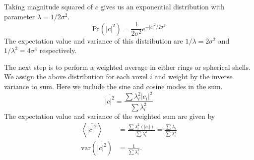 \documentclass{article}
\begin{document}
Taking magnitude squared of $c$ gives us an exponential distribution with parameter $\lambda=1/2\sigma^2$.
\begin{equation}
\mathrm{Pr}(|c|^2) = \frac{1}{2\sigma^2}e^{-|c|^2/2\sigma^2}
\end{equation}
The expectation value and variance of this distribution are $1/\lambda = 2\sigma^2$ and $1/\lambda^2 = 4\sigma^4$ respectively.

The next step is to perform a weighted average in either rings or spherical shells. We assign the above distribution for each voxel $i$ and weight by the inverse variance to sum. Here we include the sine and cosine modes in the sum.
\begin{equation}
\overline{|c|^2} = \frac{\sum\lambda_i^2 |c_i|^2}{\sum \lambda_i^2}
\end{equation}
The expectation value and variance of the weighted sum are given by
\begin{subequations}
\begin{align}
\left<\overline{|c|^2}\right> & = \frac{\sum\lambda_i^2 \left<|c_i|\right>}{\sum \lambda_i^2} = \frac{\sum\lambda_i}{\sum \lambda_i^2} \\
\mathrm{var}(\overline{|c|^2})& = \frac{1}{\sum \lambda_i^2}.
\end{align}
\end{subequations}
\end{document}
